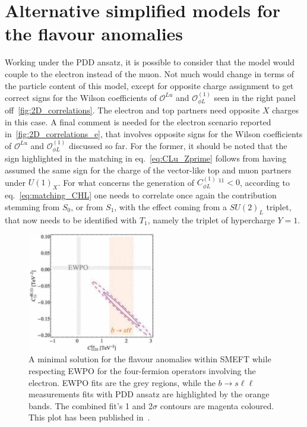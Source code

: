 



\section{Alternative simplified models for the flavour anomalies}
\label{app:EW}
Working under the PDD ansatz, it is possible to consider that the model would couple to the electron instead of the muon. Not much would change in terms of the particle content of this model, except for opposite charge assignment to get correct signs for the Wilson coefficients of $\mathcal O^{Lu}$ and $\mathcal O_{\phi L}^{(1)}$ seen in the right panel off~\autoref{fig:2D_correlations}. The electron and top partners need opposite $X$ charges in this case.
A final comment is needed for the electron scenario reported in~\autoref{fig:2D_correlations_e}, that involves opposite signs for the Wilson coefficients of $\mathcal O^{Lu}$ and $\mathcal O_{\phi L}^{(1)}$ discussed so far. For the former, it should be noted that the sign highlighted in the matching in eq.~\eqref{eq:CLu_Zprime} follows from having assumed the same sign for the charge of the vector-like top and muon partners under $U(1)_{X}$. For what concerns the generation of $C_{\phi L}^{(1)} \ ^{11} < 0 $, according to eq.~\eqref{eq:matching_CHL} one needs to correlate once again the contribution stemming from $S_{0}$, or from $S_{1}$, with the effect coming from a $SU(2)_{L}$ triplet, that now needs to be identified with $T_{1}$, namely the triplet of hypercharge $Y=1$.
\begin{figure}[htpb!]
	\centering
	\includegraphics[width=0.5\textwidth]{figures/CHL_CLu_e.pdf}
	\caption{ A minimal solution for the flavour anomalies within SMEFT while respecting EWPO for the four-fermion operators involving the electron. EWPO fits are the grey regions, while the $b \to s\ell \ell$ measurements fits with PDD ansatz are highlighted by the orange bands. The combined fit's 1 and 2$\sigma$ contours are magenta coloured. This plot has been published in~\cite{Alasfar:2020mne}.  } 
	\label{fig:2D_correlations_e}
\end{figure}
